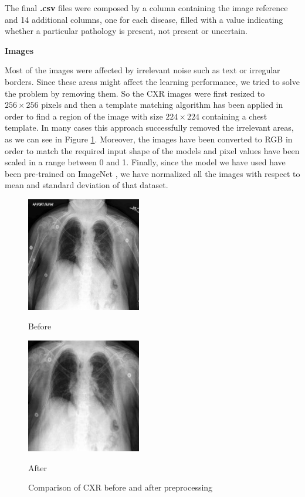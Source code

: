 \noindent The final \textbf{.csv} files were composed by a column containing the image reference and 14 additional columns, one for each disease, filled with a value indicating whether a particular pathology is present, not present or uncertain.


\vspace{5mm}

\noindent\textbf{Images}

\vspace{5mm}

\noindent Most of the images were affected by irrelevant noise such as text or irregular borders. Since these areas might affect the learning performance, we tried to solve the problem by removing them. So the \ac{CXR} images were first resized to $256 \times 256$ pixels and then a template matching algorithm has been applied in order to find a region of the image with size $224 \times 224$ containing a chest template. In many cases this approach successfully removed the irrelevant areas, as we can see in Figure \ref{fig:figure_3_2}. Moreover, the images have been converted to RGB in order to match the required input shape of the models and pixel values have been scaled in a range between 0 and 1. Finally, since the model we have used have been pre-trained on ImageNet \cite{imagenet}, we have normalized all the images with respect to mean and standard deviation of that dataset.

\vspace{5mm}


\begin{figure}[h!]
\centering
\begin{minipage}{.4\textwidth}
  \centering
  \includegraphics[width=5cm]{Tesi/images/img1}
  \caption*{Before}
\end{minipage}%
\begin{minipage}{.4\textwidth}
  \centering
  \includegraphics[width=5cm]{Tesi/images/img2}
  \caption*{After}

\end{minipage}
\caption{Comparison of \ac{CXR} before and after preprocessing}%
\label{fig:figure_3_2}
\end{figure}

